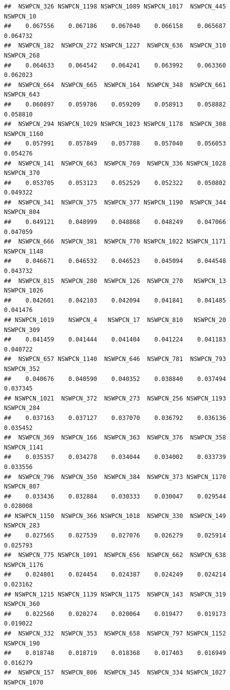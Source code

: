 \documentclass{article}\usepackage[]{graphicx}\usepackage[]{color}
\makeatletter
\newenvironment{kframe}{%
 \def\at@end@of@kframe{}%
 \ifinner\ifhmode%
  \def\at@end@of@kframe{\end{minipage}}%
  \begin{minipage}{\columnwidth}%
 \fi\fi%
 \def\FrameCommand##1{\hskip\@totalleftmargin \hskip-\fboxsep
 \colorbox{shadecolor}{##1}\hskip-\fboxsep
     \hskip-\linewidth \hskip-\@totalleftmargin \hskip\columnwidth}%
 \MakeFramed {\advance\hsize-\width
   \@totalleftmargin\z@ \linewidth\hsize
   \@setminipage}}%
 {\par\unskip\endMakeFramed%
 \at@end@of@kframe}
\newenvironment{knitrout}{}{} %
\makeatother
\begin{document}
\begin{knitrout}
\begin{kframe}
\begin{verbatim}
##  NSWPCN_326 NSWPCN_1198 NSWPCN_1089 NSWPCN_1017  NSWPCN_445   NSWPCN_10 
##    0.067556    0.067186    0.067040    0.066158    0.065687    0.064732 
##  NSWPCN_182  NSWPCN_272 NSWPCN_1227  NSWPCN_636  NSWPCN_310  NSWPCN_268 
##    0.064633    0.064542    0.064241    0.063992    0.063360    0.062023 
##  NSWPCN_664  NSWPCN_665  NSWPCN_164  NSWPCN_348  NSWPCN_661  NSWPCN_643 
##    0.060897    0.059786    0.059209    0.058913    0.058882    0.058810 
##  NSWPCN_294 NSWPCN_1029 NSWPCN_1023 NSWPCN_1178  NSWPCN_308 NSWPCN_1160 
##    0.057991    0.057849    0.057788    0.057040    0.056053    0.054276 
##  NSWPCN_141  NSWPCN_663  NSWPCN_769  NSWPCN_336 NSWPCN_1028  NSWPCN_370 
##    0.053705    0.053123    0.052529    0.052322    0.050802    0.049322 
##  NSWPCN_341  NSWPCN_375  NSWPCN_377 NSWPCN_1190  NSWPCN_344  NSWPCN_804 
##    0.049121    0.048999    0.048868    0.048249    0.047066    0.047059 
##  NSWPCN_666  NSWPCN_381  NSWPCN_770 NSWPCN_1022 NSWPCN_1171 NSWPCN_1148 
##    0.046671    0.046532    0.046523    0.045094    0.044548    0.043732 
##  NSWPCN_815  NSWPCN_280  NSWPCN_126  NSWPCN_270   NSWPCN_13 NSWPCN_1026 
##    0.042601    0.042103    0.042094    0.041841    0.041485    0.041476 
## NSWPCN_1019    NSWPCN_4   NSWPCN_17  NSWPCN_810   NSWPCN_20  NSWPCN_309 
##    0.041459    0.041444    0.041404    0.041224    0.041183    0.040722 
##  NSWPCN_657 NSWPCN_1140  NSWPCN_646  NSWPCN_781  NSWPCN_793  NSWPCN_352 
##    0.040676    0.040590    0.040352    0.038840    0.037494    0.037345 
## NSWPCN_1021  NSWPCN_372  NSWPCN_273  NSWPCN_256 NSWPCN_1193  NSWPCN_284 
##    0.037163    0.037127    0.037070    0.036792    0.036136    0.035452 
##  NSWPCN_369  NSWPCN_166  NSWPCN_363  NSWPCN_376  NSWPCN_358 NSWPCN_1141 
##    0.035357    0.034278    0.034044    0.034002    0.033739    0.033556 
##  NSWPCN_796  NSWPCN_350  NSWPCN_384  NSWPCN_373 NSWPCN_1170  NSWPCN_807 
##    0.033436    0.032884    0.030333    0.030047    0.029544    0.028008 
## NSWPCN_1150  NSWPCN_366 NSWPCN_1018  NSWPCN_330  NSWPCN_149  NSWPCN_283 
##    0.027565    0.027539    0.027076    0.026279    0.025914    0.025793 
##  NSWPCN_775 NSWPCN_1091  NSWPCN_656  NSWPCN_662  NSWPCN_638 NSWPCN_1176 
##    0.024801    0.024454    0.024387    0.024249    0.024214    0.023162 
## NSWPCN_1215 NSWPCN_1139 NSWPCN_1175  NSWPCN_143  NSWPCN_319  NSWPCN_360 
##    0.022560    0.020274    0.020064    0.019477    0.019173    0.019022 
##  NSWPCN_332  NSWPCN_353  NSWPCN_658  NSWPCN_797 NSWPCN_1152  NSWPCN_190 
##    0.018748    0.018719    0.018368    0.017403    0.016949    0.016279 
##  NSWPCN_157  NSWPCN_806  NSWPCN_345  NSWPCN_334 NSWPCN_1027 NSWPCN_1070 

\end{verbatim}
\end{kframe}
\end{knitrout}
\end{document}
